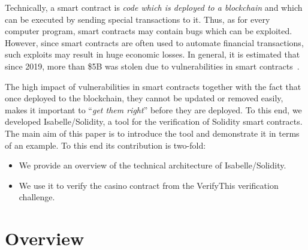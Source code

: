 \documentclass[a4paper,UKenglish,cleveref, autoref, thm-restate]{oasics-v2021}
\begin{document}
Technically, a smart contract is \emph{code which is deployed to a blockchain} and which can be executed by sending special transactions to it.
Thus, as for every computer program, smart contracts may contain bugs which can be exploited.
However, since smart contracts are often used to automate financial transactions, such exploits may result in huge economic losses.
In general, it is estimated that since 2019, more than \$5B was stolen due to vulnerabilities in smart contracts~\cite{CipherTrace2021}.

The high impact of vulnerabilities in smart contracts together with the fact that once deployed to the blockchain, they cannot be updated or removed easily, makes it important to ``\emph{get them right}'' before they are deployed.
To this end, we developed Isabelle/Solidity, a tool for the verification of Solidity smart contracts.
The main aim of this paper is to introduce the tool and demonstrate it in terms of an example.
To this end its contribution is two-fold:
\begin{itemize}
	\item We provide an overview of the technical architecture of Isabelle/Solidity.
	\item We use it to verify the casino contract from the VerifyThis verification challenge.
\end{itemize}

\section{Overview}
\label{sec-overview}
\end{document}
